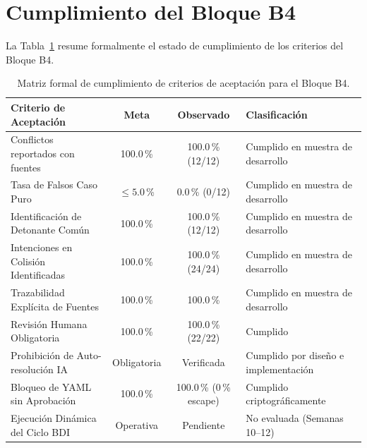 \documentclass[11pt,a4paper]{article}
\begin{document}
\section{Cumplimiento del Bloque B4}
La Tabla~\ref{tab:cumplimiento_b4} resume formalmente el estado de cumplimiento de los criterios del Bloque B4.

\begin{table}[H]
\centering
\small
\caption{Matriz formal de cumplimiento de criterios de aceptación para el Bloque B4.}
\label{tab:cumplimiento_b4}
\begin{tabularx}{\textwidth}{Xccp{4.8cm}}
\toprule
\textbf{Criterio de Aceptación} & \textbf{Meta} & \textbf{Observado} & \textbf{Clasificación} \\
\midrule
Conflictos reportados con fuentes & 100.0\,\% & 100.0\,\% (12/12) & Cumplido en muestra de desarrollo \\
Tasa de Falsos Caso Puro & $\le 5.0$\,\% & 0.0\,\% (0/12) & Cumplido en muestra de desarrollo \\
Identificación de Detonante Común & 100.0\,\% & 100.0\,\% (12/12) & Cumplido en muestra de desarrollo \\
Intenciones en Colisión Identificadas & 100.0\,\% & 100.0\,\% (24/24) & Cumplido en muestra de desarrollo \\
Trazabilidad Explícita de Fuentes & 100.0\,\% & 100.0\,\% & Cumplido en muestra de desarrollo \\
Revisión Humana Obligatoria & 100.0\,\% & 100.0\,\% (22/22) & Cumplido \\
Prohibición de Auto-resolución IA & Obligatoria & Verificada & Cumplido por diseño e implementación \\
Bloqueo de YAML sin Aprobación & 100.0\,\% & 100.0\,\% (0\,\% escape) & Cumplido criptográficamente \\
Ejecución Dinámica del Ciclo BDI & Operativa & Pendiente & No evaluada (Semanas 10--12) \\
\bottomrule
\end{tabularx}
\end{table}

\end{document}
